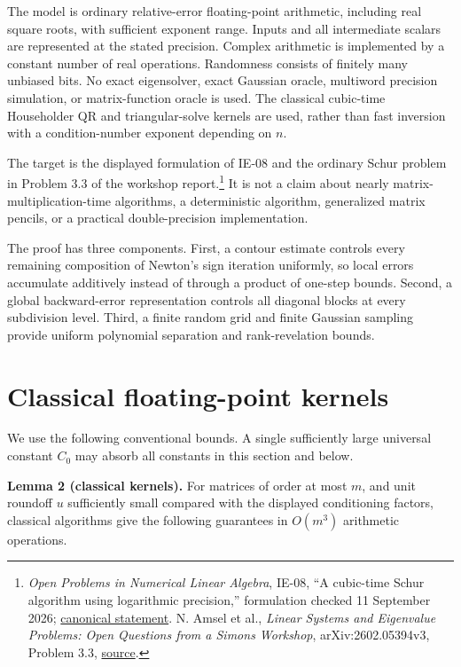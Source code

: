 \documentclass[10pt,a4paper]{article}
\begin{document}
The model is ordinary relative-error floating-point arithmetic,
including real square roots, with sufficient exponent range. Inputs and
all intermediate scalars are represented at the stated precision.
Complex arithmetic is implemented by a constant number of real
operations. Randomness consists of finitely many unbiased bits. No exact
eigensolver, exact Gaussian oracle, multiword precision simulation, or
matrix-function oracle is used. The classical cubic-time Householder QR
and triangular-solve kernels are used, rather than fast inversion with a
condition-number exponent depending on \(n\).

The target is the displayed formulation of IE-08 and the ordinary Schur
problem in Problem 3.3 of the workshop report.\footnote{\emph{Open
  Problems in Numerical Linear Algebra}, IE-08, ``A cubic-time Schur
  algorithm using logarithmic precision,'' formulation checked 11
  September 2026;
  \href{https://github.com/ajt60gaibb/OpenProblemsInNLA/blob/main/eigenvalues-and-inverse-problems/IE-08/README.md}{canonical
  statement}. N. Amsel et al., \emph{Linear Systems and Eigenvalue
  Problems: Open Questions from a Simons Workshop}, arXiv:2602.05394v3,
  Problem 3.3,
  \href{https://arxiv.org/html/2602.05394v3\#S3.SS2}{source}.} It is not
a claim about nearly matrix-multiplication-time algorithms, a
deterministic algorithm, generalized matrix pencils, or a practical
double-precision implementation.

The proof has three components. First, a contour estimate controls every
remaining composition of Newton's sign iteration uniformly, so local
errors accumulate additively instead of through a product of one-step
bounds. Second, a global backward-error representation controls all
diagonal blocks at every subdivision level. Third, a finite random grid
and finite Gaussian sampling provide uniform polynomial separation and
rank-revelation bounds.

\section{Classical floating-point
kernels}\label{classical-floating-point-kernels}

We use the following conventional bounds. A single sufficiently large
universal constant \(C_0\) may absorb all constants in this section and
below.

\textbf{Lemma 2 (classical kernels).} For matrices of order at most
\(m\), and unit roundoff \(u\) sufficiently small compared with the
displayed conditioning factors, classical algorithms give the following
guarantees in \(O(m^3)\) arithmetic operations.
\end{document}
